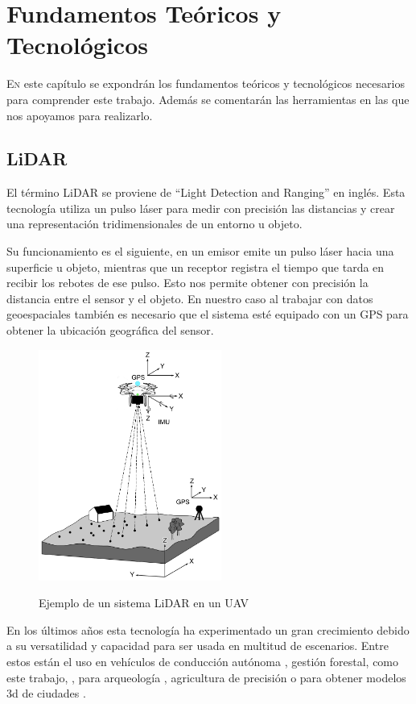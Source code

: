 \chapter{Fundamentos Teóricos y Tecnológicos}
\label{chap:fundamentos}

\lettrine{E}{n} este capítulo se expondrán los fundamentos teóricos y tecnológicos necesarios para comprender este trabajo. Además se comentarán las herramientas en las que nos apoyamos para realizarlo.

\section{LiDAR}

El término LiDAR se proviene de “Light Detection and Ranging” en inglés. Esta tecnología utiliza un pulso láser para medir con precisión las distancias y crear una representación tridimensionales de un entorno u objeto.

Su funcionamiento es el siguiente, en un emisor emite un pulso láser hacia una superficie u objeto, mientras que un receptor registra el tiempo que tarda en recibir los rebotes de ese pulso. Esto nos permite obtener con precisión la distancia entre el sensor y el objeto. En nuestro caso al trabajar con datos geoespaciales también es necesario que el sistema esté equipado con un GPS para obtener la ubicación geográfica del sensor.


\begin{figure}[h]
\centering
\includegraphics[width=6cm]{imaxes/remotesensing-10-01094-g001.png}
\label{fig:uavsensor}
\caption{Ejemplo de un sistema LiDAR en un UAV \cite{rs10071094}}
\end{figure}


En los últimos años esta tecnología ha experimentado un gran crecimiento debido a su versatilidad y capacidad para ser usada en multitud de escenarios. Entre estos están el uso en vehículos de conducción autónoma \cite{articleauto}, gestión forestal, como este trabajo, \cite{rs14010170}, para arqueología \cite{lidararque}, agricultura de precisión \cite{RIVERA2023107737} o para obtener modelos 3d de ciudades \cite{lidarcity}.

